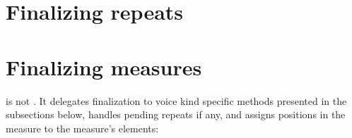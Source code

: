 \section{Finalizing repeats}


\section{Finalizing measures}

 is not \cascaded. It delegates finalization to voice kind specific methods presented in the subsections below, handles pending repeats if any, and assigns positions in the measure to the measure's elements:
